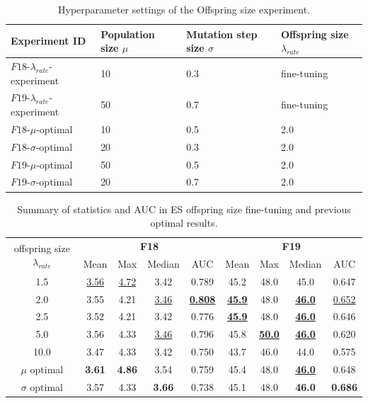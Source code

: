 \documentclass{article}
\begin{document}
\begin{table}[!ht]
    \centering
    \caption{Hyperparameter settings of the Offspring size experiment.}
    \label{tab:al-es-os-hyper}
    \begin{tabular}{llll}
       \toprule
       \textbf{Experiment ID} & \textbf{Population size $\mu$} & \textbf{Mutation step size $\sigma$} & \textbf{Offspring size $\lambda_{rate}$}\\
       \midrule
       $F18$-$\lambda_{rate}$-experiment & 10 & 0.3 & fine-tuning\\
       $F19$-$\lambda_{rate}$-experiment & 50 & 0.7 & fine-tuning\\
       $F18$-$\mu$-optimal & 10 & 0.5 & 2.0\\
       $F18$-$\sigma$-optimal & 20 & 0.3 & 2.0\\
       $F19$-$\mu$-optimal & 50 & 0.5 & 2.0\\
       $F19$-$\sigma$-optimal & 20 & 0.7 & 2.0\\
       
       \bottomrule
    \end{tabular}
\end{table}

\begin{table}[!ht]
    \centering
    \caption{Summary of statistics and AUC in ES offspring size fine-tuning and previous optimal results.}
    \label{tab:experi-es-osize}
    \begin{tabular}{ccccccccc}
        \toprule
        \multirow{2}[3]{*}{offspring size $\lambda_{rate}$} &
        \multicolumn{4}{c}{\textbf{F18}} &
        \multicolumn{4}{c}{\textbf{F19}}\\
        \cmidrule(lr){2-5}
        \cmidrule(lr){6-9}
        & Mean & Max & Median & AUC & Mean & Max & Median & AUC\\
        \midrule
        1.5   & \underline{3.56} & \underline{4.72} & 3.42 & 0.789& 45.2& 48.0& 45.0& 0.647\\
        2.0   & 3.55 & 4.21 & \underline{3.46} &\underline{\textbf{ 0.808}}& \underline{\textbf{45.9}}& 48.0 & \underline{\textbf{46.0}} & \underline{0.652}\\
        2.5   & 3.52 & 4.21 & 3.42 & 0.776& \underline{\textbf{45.9}}& 48.0 & \underline{\textbf{46.0}} & 0.646\\
        5.0   & 3.56 & 4.33 & \underline{3.46} & 0.796& 45.8& \underline{\textbf{50.0}}& \underline{\textbf{46.0}} & 0.620\\
        10.0  & 3.47 & 4.33 & 3.42 & 0.750& 43.7& 46.0& 44.0 & 0.575\\
        \midrule
        $\mu$ optimal  & \textbf{3.61} & \textbf{4.86} & 3.54 & 0.759 & 45.4  & 48.0 & \underline{\textbf{46.0}} & 0.648\\
        $\sigma$ optimal & 3.57 & 4.33 & \textbf{3.66} & 0.738 & 45.1 & 48.0 & \textbf{46.0} & \textbf{0.686}\\
        \bottomrule
    \end{tabular}
\end{table}
\end{document}

